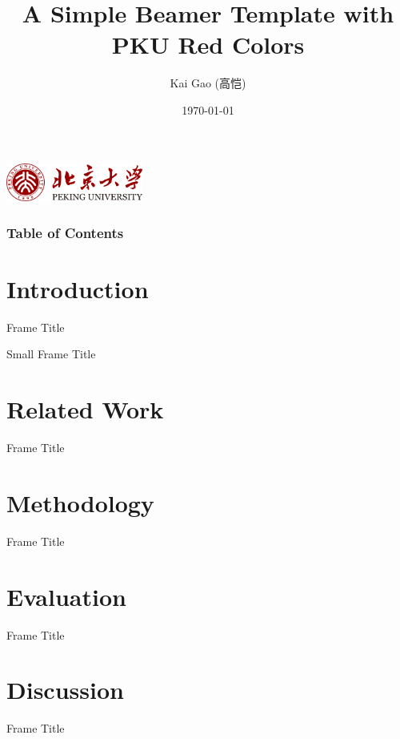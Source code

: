 \documentclass{beamer}
\title[PKU Beamer Template]
{A Simple Beamer Template with PKU Red Colors}
\author[Kai Gao]{Kai Gao (高恺)}
\institute[PKUSS]
{
  School of Software \& Microelectronics\\
  Peking University
}
\date[\today]{\today}
\begin{document}
\begin{frame}[plain]
    \centering
    \includegraphics[width=4.5cm]{pkulogo.png}
    \vspace{-5mm}
    \titlepage
\end{frame}

\begin{frame}[plain]
\frametitle{Table of Contents}
\hfill
\parbox[t]{.95\textwidth}{
  \begin{minipage}[t][0.8\textheight]{0.95\textwidth}
\tableofcontents[sectionstyle=show,subsectionstyle=show/shaded/hide,subsubsectionstyle=show/shaded/hide]
  \end{minipage}
}
\end{frame}

\section{Introduction}

\begin{frame}{Frame Title}
\end{frame}


{   
\begin{frame}{Small Frame Title}
\end{frame}
}


\section{Related Work}

\begin{frame}{Frame Title}
    
\end{frame}

\section{Methodology}

\begin{frame}{Frame Title}

\end{frame}


\section{Evaluation}
\begin{frame}{Frame Title}   
\end{frame}

\section{Discussion}
\begin{frame}{Frame Title}
    
\end{frame}
\end{document}

